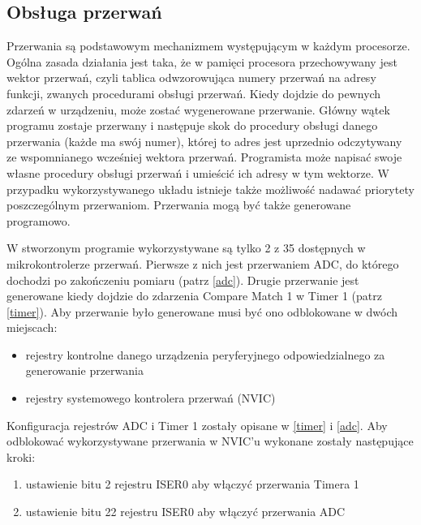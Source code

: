 \subsection{Obsługa przerwań} \label{interrupts}
Przerwania są podstawowym mechanizmem występującym w każdym procesorze. Ogólna zasada działania jest taka, że w pamięci procesora przechowywany jest wektor przerwań, czyli tablica odwzorowująca numery przerwań na adresy funkcji, zwanych procedurami obsługi przerwań. Kiedy dojdzie do pewnych zdarzeń w urządzeniu, może zostać wygenerowane przerwanie. Główny wątek programu zostaje przerwany i następuje skok do procedury obsługi danego przerwania (każde ma swój numer), której to adres jest uprzednio odczytywany ze wspomnianego wcześniej wektora przerwań. Programista może napisać swoje własne procedury obsługi przerwań i umieścić ich adresy w tym wektorze. W przypadku wykorzystywanego układu istnieje także możliwość nadawać priorytety poszczególnym przerwaniom. Przerwania mogą być także generowane programowo.

W stworzonym programie wykorzystywane są tylko 2 z 35 dostępnych w mikrokontrolerze przerwań. Pierwsze z nich jest przerwaniem ADC, do którego dochodzi po zakończeniu pomiaru (patrz \ref{adc}). Drugie przerwanie jest generowane kiedy dojdzie do zdarzenia Compare Match 1 w Timer 1 (patrz \ref{timer}). Aby przerwanie było generowane musi być ono odblokowane w dwóch miejscach:
\begin{itemize}
    \item rejestry kontrolne danego urządzenia peryferyjnego odpowiedzialnego za generowanie przerwania
    \item rejestry systemowego kontrolera przerwań (NVIC)
\end{itemize}
Konfiguracja rejestrów ADC i Timer 1 zostały opisane w \ref{timer} i \ref{adc}. Aby odblokować wykorzystywane przerwania w NVIC'u wykonane zostały następujące kroki:
\begin{enumerate}
    \item ustawienie bitu 2 rejestru ISER0 aby włączyć przerwania Timera 1
    \item ustawienie bitu 22 rejestru ISER0 aby włączyć przerwania ADC
\end{enumerate}
